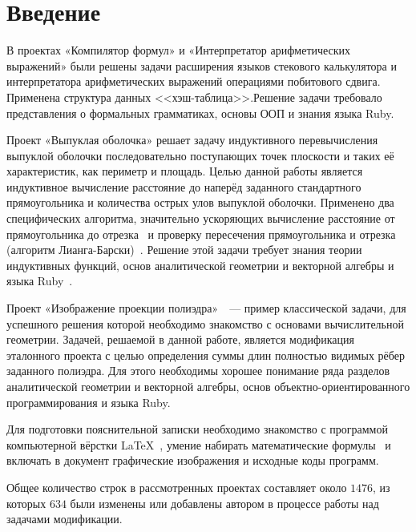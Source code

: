 \section{Введение}

В проектах «Компилятор формул» и «Интерпретатор арифметических
выражений» были решены задачи расширения языков стекового калькулятора
и интерпретатора арифметических выражений операциями побитового сдвига.
Применена структура данных <<хэш-таблица>>.Решение задачи требовало представления
о формальных грамматиках, основы ООП и знания языка Ruby.

Проект «Выпуклая оболочка»\cite{convex} решает задачу индуктивного перевычисления выпуклой оболочки последовательно поступающих точек плоскости и таких её характеристик, как периметр и площадь. Целью данной работы является
индуктивное вычисление расстояние до наперёд заданного стандартного прямоугольника
и количества острых улов выпуклой оболочки. Применено два специфических алгоритма,
значительно ускоряющих вычисление расстояние от прямоугольника до
отрезка~\cite{seginters} и проверку пересечения прямоугольника и
отрезка (алгоритм Лианга-Барски)~\cite{barsky}. Решение этой задачи требует знания
теории индуктивных функций, основ аналитической геометрии и векторной алгебры
и языка Ruby~\cite{ruby}.

Проект «Изображение проекции полиэдра»~\cite{polyedr}~--- пример
классической задачи, для успешного решения которой необходимо знакомство с
основами вычислительной геометрии. Задачей, решаемой в данной работе, является
модификация эталонного проекта с целью определения суммы длин полностью видимых
рёбер заданного полиэдра. Для этого необходимы хорошее понимание ряда разделов
аналитической геометрии и векторной алгебры, основ объектно-ориентированного
программирования и языка Ruby.

Для подготовки пояснительной записки необходимо знакомство с программой компьютерной вёрстки \LaTeX~\cite{rlatex}, умение набирать математические формулы~\cite{texbook} и включать в документ графические изображения и исходные
коды программ.

Общее количество строк в рассмотренных проектах составляет около $1476$, из которых $634$ были изменены или добавлены автором в процессе работы над задачами модификации.
